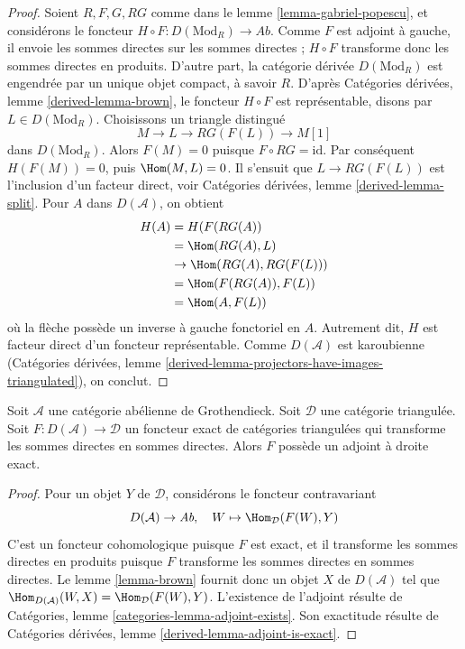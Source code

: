 \begin{proof}
Soient $R, F, G, RG$ comme dans le lemme \ref{lemma-gabriel-popescu}, et
considérons le foncteur $H \circ F : D(\text{Mod}_R) \to \textit{Ab}$.
Comme $F$ est adjoint à gauche, il envoie les sommes directes sur les sommes
directes ; $H \circ F$ transforme donc les sommes directes en produits.
D'autre part, la catégorie dérivée $D(\text{Mod}_R)$ est engendrée par un
unique objet compact, à savoir $R$. D'après Catégories dérivées, lemme
\ref{derived-lemma-brown}, le foncteur $H \circ F$ est représentable, disons
par $L \in D(\text{Mod}_R)$. Choisissons un triangle distingué
$$
M \to L \to RG(F(L)) \to M[1]
$$
dans $D(\text{Mod}_R)$. Alors $F(M) = 0$ puisque
$F \circ RG = \text{id}$. Par conséquent $H(F(M)) = 0$, puis
$\Hom(M, L) = 0$. Il s'ensuit que $L \to RG(F(L))$ est l'inclusion d'un
facteur direct, voir Catégories dérivées, lemme \ref{derived-lemma-split}.
Pour $A$ dans $D(\mathcal{A})$, on obtient
\begin{align*}
H(A)
& =
H(F(RG(A)) \\
& =
\Hom(RG(A), L) \\
& \to
\Hom(RG(A), RG(F(L))) \\
& =
\Hom(F(RG(A)), F(L)) \\
& =
\Hom(A, F(L))
\end{align*}
où la flèche possède un inverse à gauche fonctoriel en $A$. Autrement dit,
$H$ est facteur direct d'un foncteur représentable. Comme $D(\mathcal{A})$
est karoubienne (Catégories dérivées, lemme
\ref{derived-lemma-projectors-have-images-triangulated}), on conclut.
\end{proof}

\begin{proposition}
\label{proposition-brown}
Soit $\mathcal{A}$ une catégorie abélienne de Grothendieck. Soit $\mathcal{D}$
une catégorie triangulée. Soit $F : D(\mathcal{A}) \to \mathcal{D}$ un
foncteur exact de catégories triangulées qui transforme les sommes directes en
sommes directes. Alors $F$ possède un adjoint à droite exact.
\end{proposition}

\begin{proof}
Pour un objet $Y$ de $\mathcal{D}$, considérons le foncteur contravariant
$$
D(\mathcal{A}) \to \textit{Ab},\quad
W \mapsto \Hom_\mathcal{D}(F(W), Y)
$$
C'est un foncteur cohomologique puisque $F$ est exact, et il transforme les
sommes directes en produits puisque $F$ transforme les sommes directes en
sommes directes. Le lemme \ref{lemma-brown} fournit donc un objet $X$ de
$D(\mathcal{A})$ tel que
$\Hom_{D(\mathcal{A})}(W, X) = \Hom_\mathcal{D}(F(W), Y)$.
L'existence de l'adjoint résulte de Catégories, lemme
\ref{categories-lemma-adjoint-exists}. Son exactitude résulte de Catégories
dérivées, lemme \ref{derived-lemma-adjoint-is-exact}.
\end{proof}


















